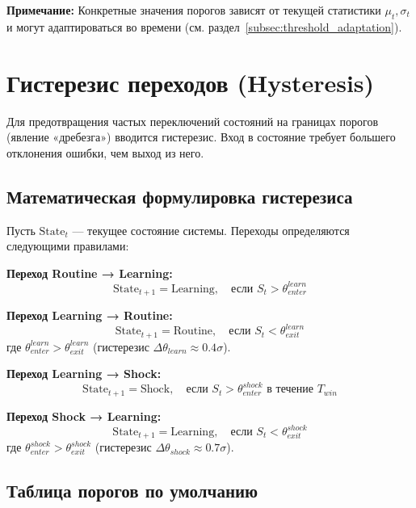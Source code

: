 \textbf{Примечание:} Конкретные значения порогов зависят от текущей статистики $\mu_t, \sigma_t$ и могут адаптироваться во времени (см. раздел~\ref{subsec:threshold_adaptation}).

\section{Гистерезис переходов (Hysteresis)}
\label{sec:hysteresis}

Для предотвращения частых переключений состояний на границах порогов (явление «дребезга») вводится гистерезис. Вход в состояние требует большего отклонения ошибки, чем выход из него.

\subsection{Математическая формулировка гистерезиса}

Пусть $\text{State}_t$ — текущее состояние системы. Переходы определяются следующими правилами:

\textbf{Переход Routine → Learning:}
\begin{equation}
\text{State}_{t+1} = \text{Learning}, \quad \text{если } S_t > \theta_{enter}^{learn}
\label{eq:routine_to_learning}
\end{equation}

\textbf{Переход Learning → Routine:}
\begin{equation}
\text{State}_{t+1} = \text{Routine}, \quad \text{если } S_t < \theta_{exit}^{learn}
\label{eq:learning_to_routine}
\end{equation}
где $\theta_{enter}^{learn} > \theta_{exit}^{learn}$ (гистерезис $\Delta\theta_{learn} \approx 0.4\sigma$).

\textbf{Переход Learning → Shock:}
\begin{equation}
\text{State}_{t+1} = \text{Shock}, \quad \text{если } S_t > \theta_{enter}^{shock} \text{ в течение } T_{win}
\label{eq:learning_to_shock}
\end{equation}

\textbf{Переход Shock → Learning:}
\begin{equation}
\text{State}_{t+1} = \text{Learning}, \quad \text{если } S_t < \theta_{exit}^{shock}
\label{eq:shock_to_learning}
\end{equation}
где $\theta_{enter}^{shock} > \theta_{exit}^{shock}$ (гистерезис $\Delta\theta_{shock} \approx 0.7\sigma$).

\subsection{Таблица порогов по умолчанию}


